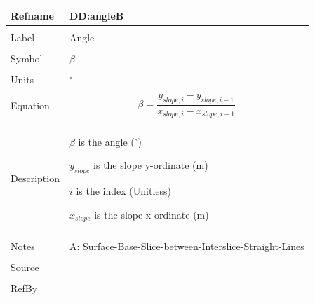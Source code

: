 \documentclass[12pt]{article}
\begin{document}
\noindent \begin{minipage}{\textwidth}
\begin{tabular}{p{} p{}}
\toprule \textbf{Refname} & \textbf{DD:angleB}
\label{DD:angleB}
\\ \midrule \\
Label & Angle
        \\ \midrule \\
        Symbol & $β$
                 \\ \midrule \\
                 Units & ${}^{\circ}$
                         \\ \midrule \\
                         Equation & \begin{displaymath}
                                    β=\frac{{y_{slope,i}}-{y_{slope,i-1}}}{{x_{slope,i}}-{x_{slope,i-1}}}
                                    \end{displaymath}
                                    \\ \midrule \\
                                    Description & \begin{symbDescription}
                                                  \item{$β$ is the angle (${}^{\circ}$)}
                                                  \item{${y_{slope}}$ is the slope y-ordinate (m)}
                                                  \item{$i$ is the index (Unitless)}
                                                  \item{${x_{slope}}$ is the slope x-ordinate (m)}
                                                  \end{symbDescription}
                                                  \\ \midrule \\
                                                  Notes & \hyperref[A:Surface-Base-Slice-between-Interslice-Straight-Lines]{A: Surface-Base-Slice-between-Interslice-Straight-Lines}
                                                          \\ \midrule \\
                                                          Source & \cite{fredlund1977}
                                                                   \\ \midrule \\
                                                                   RefBy & 
\\ \bottomrule \end{tabular}
\end{minipage}
\par~
\end{document}
